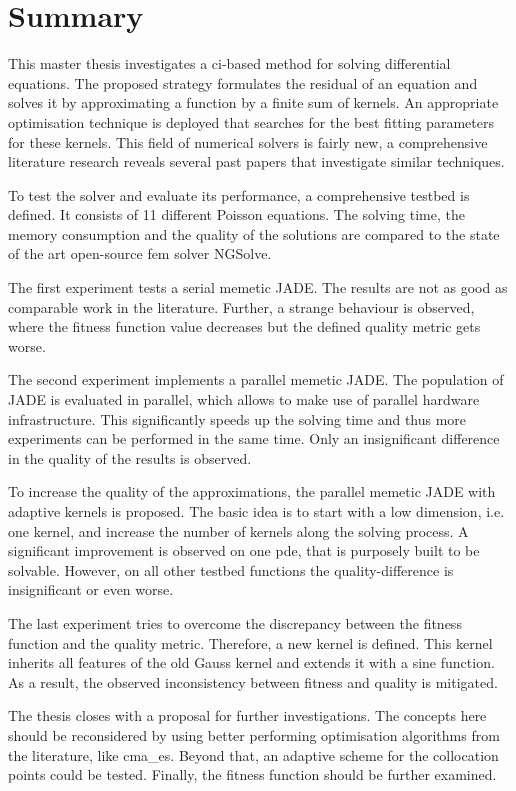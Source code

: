 \documentclass[./\jobname.tex]{subfiles}
\begin{document}
\chapter{Summary}

This master thesis investigates a \gls{ci}-based method for solving differential equations. The proposed strategy formulates the residual of an equation and solves it by approximating a function by a finite sum of kernels. An appropriate optimisation technique is deployed that searches for the best fitting parameters for these kernels. This field of numerical solvers is fairly new, a comprehensive literature research reveals several past papers that investigate similar techniques.

To test the solver and evaluate its performance, a comprehensive testbed is defined. It consists of 11 different Poisson equations. The solving time, the memory consumption and the quality of the solutions are compared to the state of the art open-source \gls{fem} solver NGSolve. 

The first experiment tests a serial memetic JADE. The results are not as good as comparable work in the literature. Further, a strange behaviour is observed, where the fitness function value decreases but the defined quality metric gets worse. 

The second experiment implements a parallel memetic JADE. The population of JADE is evaluated in parallel, which allows to make use of parallel hardware infrastructure. This significantly speeds up the solving time and thus more experiments can be performed in the same time. Only an insignificant difference in the quality of the results is observed. 

To increase the quality of the approximations, the parallel memetic JADE with adaptive kernels is proposed. The basic idea is to start with a low dimension, i.e. one kernel, and increase the number of kernels along the solving process. A significant improvement is observed on one \gls{pde}, that is purposely built to be solvable. However, on all other testbed functions the quality-difference is insignificant or even worse. 

The last experiment tries to overcome the discrepancy between the fitness function and the quality metric. Therefore, a new kernel is defined. This kernel inherits all features of the old Gauss kernel and extends it with a sine function. As a result, the observed inconsistency between fitness and quality is mitigated. 

The thesis closes with a proposal for further investigations. The concepts here should be reconsidered by using better performing optimisation algorithms from the literature, like \gls{cma_es}. Beyond that, an adaptive scheme for the collocation points could be tested. Finally, the fitness function should be further examined.
\end{document}
